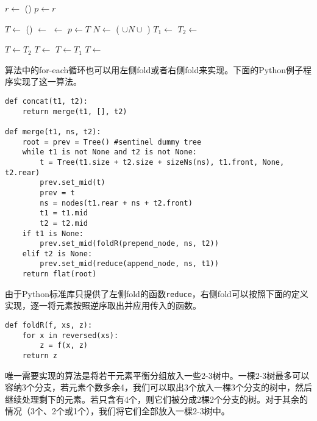 \documentclass[UTF8]{article}
\begin{document}
\begin{algorithmic}
  \State \Return {}
\EndFunction
\Statex
{}
  \State $r \gets$ ()
  \State $p \gets r$

    \State $T \gets$ ()
    \State {} $\gets$ 
    \State {} $\gets$ 
    \State {}
    \State $p \gets T$
    \State $N \gets$ ( $\cup N \cup$ )
    \State $T_1 \gets$ 
    \State $T_2 \gets$ 
  \EndWhile

    \State $T \gets T_2$
      \State $T \gets$ 
    \EndFor
    \State $T \gets T_1$
      \State $T \gets$ 
    \EndFor
  \EndIf
  \State {}

  \State \Return {}
\EndFunction
\end{algorithmic}

算法中的for-each循环也可以用左侧fold或者右侧fold来实现。下面的Python例子程序实现了这一算法。

\lstset{language=Python}
\begin{lstlisting}
def concat(t1, t2):
    return merge(t1, [], t2)

def merge(t1, ns, t2):
    root = prev = Tree() #sentinel dummy tree
    while t1 is not None and t2 is not None:
        t = Tree(t1.size + t2.size + sizeNs(ns), t1.front, None, t2.rear)
        prev.set_mid(t)
        prev = t
        ns = nodes(t1.rear + ns + t2.front)
        t1 = t1.mid
        t2 = t2.mid
    if t1 is None:
        prev.set_mid(foldR(prepend_node, ns, t2))
    elif t2 is None:
        prev.set_mid(reduce(append_node, ns, t1))
    return flat(root)
\end{lstlisting}

由于Python标准库只提供了左侧fold的函数\texttt{reduce}，右侧fold可以按照下面的定义实现，逐一将元素按照逆序取出并应用传入的函数。

\begin{lstlisting}
def foldR(f, xs, z):
    for x in reversed(xs):
        z = f(x, z)
    return z
\end{lstlisting}

唯一需要实现的算法是将若干元素平衡分组放入一些2-3树中。一棵2-3树最多可以容纳3个分支，若元素个数多余4，我们可以取出3个放入一棵3个分支的树中，然后继续处理剩下的元素。若只含有4个，则它们被分成2棵2个分支的树。对于其余的情况（3个、2个或1个），我们将它们全部放入一棵2-3树中。
\end{document}
